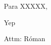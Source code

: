 \documentclass{letter}
\date{12 de octubre 1967}
\begin{document}
 

\begin{letter}{Para XXXXX,}
  \opening{
    Yep
  }

  \closing{Attm: Róman}
\end{letter}
\end{document}
